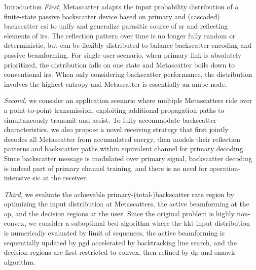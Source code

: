 \documentclass[journal]{IEEEtran}
\begin{document}
\begin{section}{Introduction}
	\emph{First,} Metascatter adapts the input probability distribution of a finite-state passive backscatter device based on primary and (cascaded) backscatter \gls{csi} to unify and generalize parasitic source of \gls{sr} and reflecting elements of \gls{irs}.
	The reflection pattern over time is no longer fully random or deterministic, but can be flexibly distributed to balance backscatter encoding and passive beamforming.
	For single-user scenario, when primary link is absolutely prioritized, the distribution falls on one state and Metascatter boils down to conventional \gls{irs}.
	When only considering backscatter performance, the distribution involves the highest entropy and Metascatter is essentially an \gls{ambc} node.

	\emph{Second,} we consider an application scenario where multiple Metascatters ride over a point-to-point transmission, exploiting additional propagation paths to simultaneously transmit and assist.
	To fully accommodate backscatter characteristics, we also propose a novel receiving strategy that first jointly decodes all Metascatter from accumulated energy, then models their reflection patterns and backscatter paths within equivalent channel for primary decoding.
	Since backscatter message is modulated over primary signal, backscatter decoding is indeed part of primary channel training, and there is no need for operation-intensive \gls{sic} at the receiver.


	\emph{Third,} we evaluate the achievable primary-(total-)backscatter rate region by optimizing the input distribution at Metascatters, the active beamforming at the \gls{ap}, and the decision regions at the user. Since the original problem is highly non-convex, we consider a suboptimal \gls{bcd} algorithm where the \gls{kkt} input distribution is numerically evaluated by limit of sequences, the active beamforming is sequentially updated by \gls{pgd} accelerated by backtracking line search, and the decision regions are first restricted to convex, then refined by \gls{dp} and \gls{smawk} algorithm.


\end{section}
\end{document}
